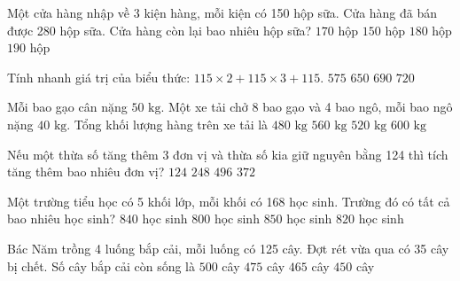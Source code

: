 \begin{ex} %
Một cửa hàng nhập về 3 kiện hàng, mỗi kiện có 150 hộp sữa. Cửa hàng đã bán được 280 hộp sữa. Cửa hàng còn lại bao nhiêu hộp sữa?
\choice
{\True $170$ hộp}
{$150$ hộp}
{$180$ hộp}
{$190$ hộp}
\end{ex}

\begin{ex} %
Tính nhanh giá trị của biểu thức: $115 \times 2 + 115 \times 3 + 115$.
\choice
{$575$}
{$650$}
{\True $690$}
{$720$}
\end{ex}

\begin{ex} %
Mỗi bao gạo cân nặng $50\text{ kg}$. Một xe tải chở 8 bao gạo và 4 bao ngô, mỗi bao ngô nặng $40\text{ kg}$. Tổng khối lượng hàng trên xe tải là
\choice
{$480\text{ kg}$}
{\True $560\text{ kg}$}
{$520\text{ kg}$}
{$600\text{ kg}$}
\end{ex}

\begin{ex} %
Nếu một thừa số tăng thêm 3 đơn vị và thừa số kia giữ nguyên bằng 124 thì tích tăng thêm bao nhiêu đơn vị?
\choice
{$124$}
{$248$}
{$496$}
{\True $372$}
\end{ex}

\begin{ex} %
Một trường tiểu học có 5 khối lớp, mỗi khối có 168 học sinh. Trường đó có tất cả bao nhiêu học sinh?
\choice
{\True $840$ học sinh}
{$800$ học sinh}
{$850$ học sinh}
{$820$ học sinh}
\end{ex}

\begin{ex} %
Bác Năm trồng 4 luống bắp cải, mỗi luống có 125 cây. Đợt rét vừa qua có 35 cây bị chết. Số cây bắp cải còn sống là
\choice
{$500$ cây}
{$475$ cây}
{\True $465$ cây}
{$450$ cây}
\end{ex}

